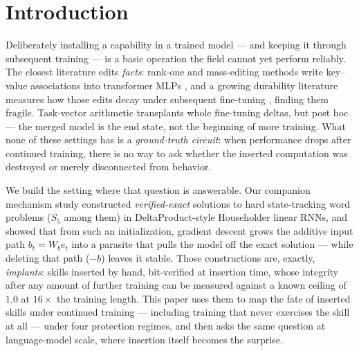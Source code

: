 \documentclass[10pt]{article}
\newcommand{\bt}{b_t}
\begin{document}
\begin{abstract}
the toy fate map reproduces --- unexercised continued training suppresses behavioral expression to
chance ($\imLmwBehNoneZeroEnd$) while the internal circuit stays exact ($\imLmwIntNoneZeroEnd$) and
readout-recoverable ($\imLmwResurrectNoneZero$); a $10\%$ exercise trickle prevents it; the
mechanism is \emph{interface drift} (the tied-embedding readout moves, not the computation). This
connects to the unlearning-robustness finding that suppression need not be removal, with the
difference that our ground truth is constructed, so we can \emph{prove} the computation survived
rather than infer it --- under honest caveats (constructed not learned, linear RNN, trivial skill,
white-box recovery). All predictions and kills were pre-registered before any run; post-hoc
analyses are labeled; every number regenerates from committed artifacts.
\end{abstract}

\section{Introduction}
Deliberately installing a capability in a trained model --- and keeping it through subsequent
training --- is a basic operation the field cannot yet perform reliably. The closest literature
edits \emph{facts}: rank-one and mass-editing methods write key--value associations into
transformer MLPs \citep{meng2022rome,meng2023memit}, and a growing durability literature measures
how those edits decay under subsequent fine-tuning
\citep{cheng2025erase,wen2025retention,gupta2024editing}, finding them fragile. Task-vector
arithmetic \citep{ilharco2023task} transplants whole fine-tuning deltas, but post hoc --- the
merged model is the end state, not the beginning of more training. What none of these settings has
is a \emph{ground-truth circuit}: when performance drops after continued training, there is no way
to ask whether the inserted computation was destroyed or merely disconnected from behavior.

We build the setting where that question is answerable. Our companion mechanism study
\citep{howe2026automaton} constructed \emph{verified-exact} solutions to hard state-tracking word
problems ($S_5$ among them) in DeltaProduct-style Householder linear RNNs, and showed that from
such an initialization, gradient descent grows the additive input path $\bt=W_b e_t$ into a
parasite that pulls the model off the exact solution --- while deleting that path ($-b$) leaves it
stable. Those constructions are, exactly, \emph{implants}: skills inserted by hand, bit-verified
at insertion time, whose integrity after any amount of further training can be measured against a
known ceiling of $1.0$ at $16\times$ the training length. This paper uses them to map the fate of
inserted skills under continued training --- including training that never exercises the skill at
all --- under four protection regimes, and then asks the same question at language-model scale,
where insertion itself becomes the surprise.
\end{document}

